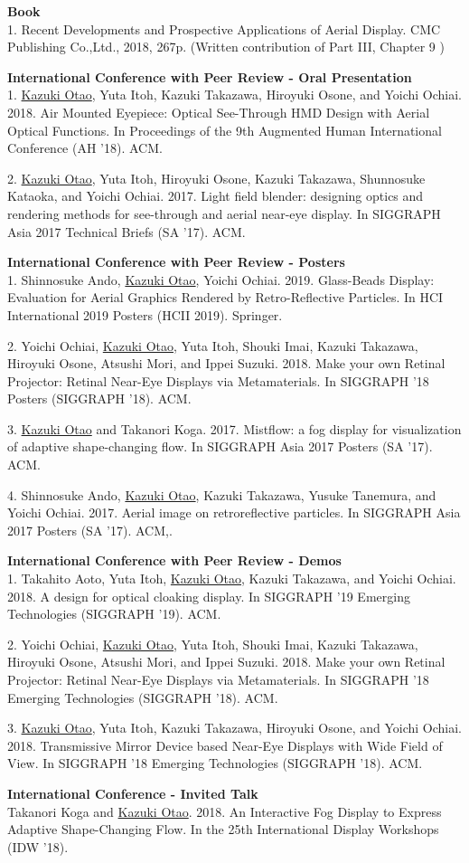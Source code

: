 \documentclass[margin]{res}
\begin{document}
\begin{resume}
{\bf Book} \\
1. Recent Developments and Prospective Applications of Aerial Display. CMC Publishing Co.,Ltd., 2018, 267p. (Written contribution of Part III, Chapter 9 )

{\bf International Conference with Peer Review - Oral Presentation} \\
1. \underline{Kazuki Otao}, Yuta Itoh, Kazuki Takazawa, Hiroyuki Osone, and Yoichi Ochiai. 2018. Air Mounted Eyepiece: Optical See-Through HMD Design with Aerial Optical Functions. In Proceedings of the 9th Augmented Human International Conference (AH ’18). ACM.

2. \underline{Kazuki Otao}, Yuta Itoh, Hiroyuki Osone, Kazuki Takazawa, Shunnosuke Kataoka, and Yoichi Ochiai. 2017. Light field blender: designing optics and rendering methods for see-through and aerial near-eye display. In SIGGRAPH Asia 2017 Technical Briefs (SA '17). ACM.

{\bf International Conference with Peer Review - Posters} \\
1. Shinnosuke Ando, \underline{Kazuki Otao}, Yoichi Ochiai. 2019. Glass-Beads Display: Evaluation for Aerial Graphics Rendered by Retro-Reflective Particles. In HCI International 2019 Posters (HCII 2019). Springer.

2. Yoichi Ochiai, \underline{Kazuki Otao}, Yuta Itoh, Shouki Imai, Kazuki Takazawa, Hiroyuki Osone, Atsushi Mori, and Ippei Suzuki. 2018. Make your own Retinal Projector: Retinal Near-Eye Displays via Metamaterials. In SIGGRAPH ’18 Posters (SIGGRAPH ’18). ACM.

3. \underline{Kazuki Otao} and Takanori Koga. 2017. Mistflow: a fog display for visualization of adaptive shape-changing flow. In SIGGRAPH Asia 2017 Posters (SA '17). ACM.

4. Shinnosuke Ando, \underline{Kazuki Otao}, Kazuki Takazawa, Yusuke Tanemura, and Yoichi Ochiai. 2017. Aerial image on retroreflective particles. In SIGGRAPH Asia 2017 Posters (SA '17). ACM,.

{\bf International Conference with Peer Review - Demos} \\
1. Takahito Aoto, Yuta Itoh, \underline{Kazuki Otao}, Kazuki Takazawa, and Yoichi Ochiai. 2018. A design for optical cloaking display. In SIGGRAPH ’19 Emerging Technologies (SIGGRAPH ’19). ACM.

2. Yoichi Ochiai, \underline{Kazuki Otao}, Yuta Itoh, Shouki Imai, Kazuki Takazawa, Hiroyuki Osone, Atsushi Mori, and Ippei Suzuki. 2018. Make your own Retinal Projector: Retinal Near-Eye Displays via Metamaterials. In SIGGRAPH ’18 Emerging Technologies (SIGGRAPH ’18). ACM.

3. \underline{Kazuki Otao}, Yuta Itoh, Kazuki Takazawa, Hiroyuki Osone, and Yoichi Ochiai. 2018. Transmissive Mirror Device based Near-Eye Displays with Wide Field of View. In SIGGRAPH ’18 Emerging Technologies (SIGGRAPH ’18). ACM.

{\bf International Conference - Invited Talk} \\
Takanori Koga and \underline{Kazuki Otao}. 2018. An Interactive Fog Display to Express Adaptive Shape-Changing Flow. In the 25th International Display Workshops (IDW '18).

\end{resume}
\end{document}
